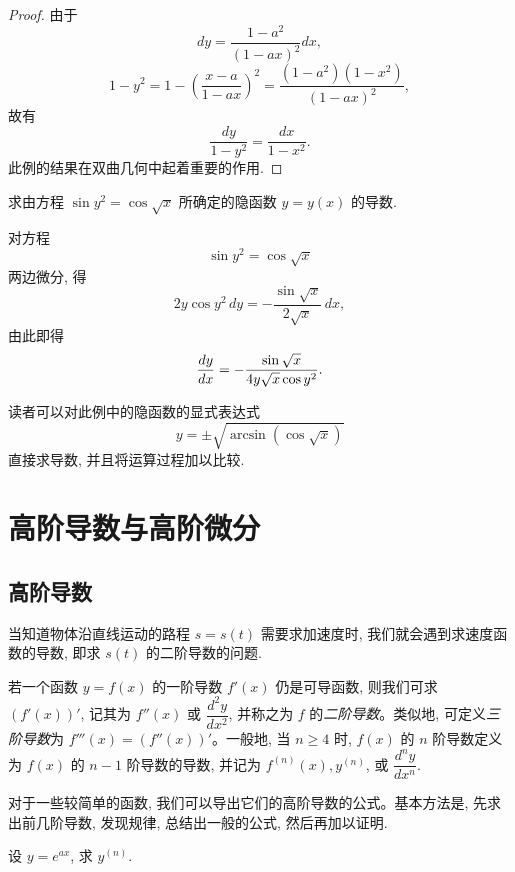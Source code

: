 \begin{proof}
由于
\[
  dy=\frac{1-a^2}{(1-ax)^2}dx,
\]
\[
  1-y^2
  =
  1-\left(\frac{x-a}{1-ax}\right)^2
  =
  \frac{(1-a^2)(1-x^2)}{(1-ax)^2},
\]
故有
\[
  \frac{dy}{1-y^2}=\frac{dx}{1-x^2}.
\]
此例的结果在双曲几何中起着重要的作用.
\end{proof}


\begin{example}\label{example:ma-4-3-5}
求由方程 $\sin y^2=\cos\sqrt{x}$ 所确定的隐函数 $y=y(x)$ 的导数.
\end{example}


\begin{solve}
对方程
\[
  \sin y^2=\cos\sqrt{x}
\]
两边微分, 得
\[
  2y\cos y^2\,dy
  =
  -\frac{\sin\sqrt{x}}{2\sqrt{x}}\,dx,
\]
由此即得
\[
  \frac{dy}{dx}
  =
  -\frac{\sin\sqrt{x}}{4y\sqrt{x}\cos y^2}.
\qedhere
\]
\end{solve}


\begin{remark}\label{remark:ma-4-source-73}
读者可以对此例中的隐函数的显式表达式
\[
  y=\pm\sqrt{\arcsin(\cos\sqrt{x})}
\]
直接求导数, 并且将运算过程加以比较.
\end{remark}


\section{高阶导数与高阶微分}
\label{sec:ma-4-4}

\subsection{高阶导数}
\label{subsec:ma-4-4-1}

当知道物体沿直线运动的路程 $s=s(t)$ 需要求加速度时, 我们就会遇到求速度函数的导数, 即求 $s(t)$ 的二阶导数的问题.

若一个函数 $y=f(x)$ 的一阶导数 $f'(x)$ 仍是可导函数, 则我们可求 $(f'(x))'$, 记其为 $f''(x)$ 或 $\dfrac{d^2y}{dx^2}$, 并称之为 $f$ 的\emph{二阶导数}。类似地, 可定义\emph{三阶导数}为 $f'''(x)=(f''(x))'$。一般地, 当 $n\geqslant4$ 时, $f(x)$ 的 $n$ 阶导数定义为 $f(x)$ 的 $n-1$ 阶导数的导数, 并记为 $f^{(n)}(x),y^{(n)}$, 或 $\dfrac{d^ny}{dx^n}$.

对于一些较简单的函数, 我们可以导出它们的高阶导数的公式。基本方法是, 先求出前几阶导数, 发现规律, 总结出一般的公式, 然后再加以证明.

\begin{example}\label{example:ma-4-4-1}
设 $y=e^{ax}$, 求 $y^{(n)}$.
\end{example}


